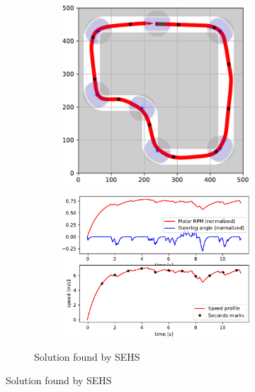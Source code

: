 \begin{figure}[!tbp]
	\vspace{0.75cm}
	
	\begin{subfigure}[t]{\textwidth}
		\begin{subfigure}[c]{0.54\textwidth}
			\includegraphics[width=\textwidth]{../img/experiments/simple-sehs-trajectory}
		\end{subfigure}
		\hfill
		\begin{subfigure}[c]{0.45\textwidth}
			\includegraphics[width=\textwidth]{../img/experiments/simple-sehs-actuators}
		\end{subfigure}
		\caption{Solution found by SEHS}
		\label{fig:simple-sehs}
	\end{subfigure}


\end{figure}
